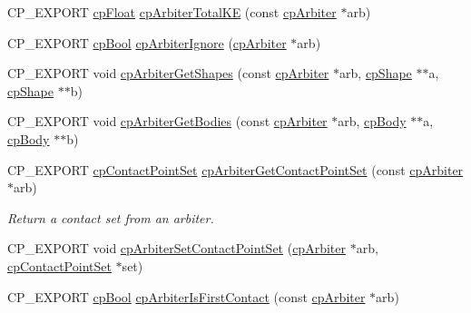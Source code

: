 \begin{DoxyCompactItemize}
\item 
C\+P\+\_\+\+E\+X\+P\+O\+RT \mbox{\hyperlink{group__basic_types_gac1ed65573e035bf892505768c852d8d3}{cp\+Float}} \mbox{\hyperlink{group__cp_arbiter_ga9918019bc0e4af5a2618e0ddeec4d64c}{cp\+Arbiter\+Total\+KE}} (const \mbox{\hyperlink{structcp_arbiter}{cp\+Arbiter}} $\ast$arb)
\item 
C\+P\+\_\+\+E\+X\+P\+O\+RT \mbox{\hyperlink{group__basic_types_gabc5e752c48f3449ca26ef413ecbd647e}{cp\+Bool}} \mbox{\hyperlink{group__cp_arbiter_ga7a643cd465bdb61b2f686fdf3558b263}{cp\+Arbiter\+Ignore}} (\mbox{\hyperlink{structcp_arbiter}{cp\+Arbiter}} $\ast$arb)
\item 
C\+P\+\_\+\+E\+X\+P\+O\+RT void \mbox{\hyperlink{group__cp_arbiter_ga521ac495c53bf25ab061a79643bb195a}{cp\+Arbiter\+Get\+Shapes}} (const \mbox{\hyperlink{structcp_arbiter}{cp\+Arbiter}} $\ast$arb, \mbox{\hyperlink{structcp_shape}{cp\+Shape}} $\ast$$\ast$a, \mbox{\hyperlink{structcp_shape}{cp\+Shape}} $\ast$$\ast$b)
\item 
C\+P\+\_\+\+E\+X\+P\+O\+RT void \mbox{\hyperlink{group__cp_arbiter_gac5371d101c55a8a9c5b471e12010a8b3}{cp\+Arbiter\+Get\+Bodies}} (const \mbox{\hyperlink{structcp_arbiter}{cp\+Arbiter}} $\ast$arb, \mbox{\hyperlink{structcp_body}{cp\+Body}} $\ast$$\ast$a, \mbox{\hyperlink{structcp_body}{cp\+Body}} $\ast$$\ast$b)
\item 
\mbox{\label{group__cp_arbiter_ga3bd7be89287b9955f650f3d9a01eae40}} 
C\+P\+\_\+\+E\+X\+P\+O\+RT \mbox{\hyperlink{structcp_contact_point_set}{cp\+Contact\+Point\+Set}} \mbox{\hyperlink{group__cp_arbiter_ga3bd7be89287b9955f650f3d9a01eae40}{cp\+Arbiter\+Get\+Contact\+Point\+Set}} (const \mbox{\hyperlink{structcp_arbiter}{cp\+Arbiter}} $\ast$arb)
\begin{DoxyCompactList}\small\item\em Return a contact set from an arbiter. \end{DoxyCompactList}\item 
C\+P\+\_\+\+E\+X\+P\+O\+RT void \mbox{\hyperlink{group__cp_arbiter_ga2a68f589f58dbae29de18cebee3de02d}{cp\+Arbiter\+Set\+Contact\+Point\+Set}} (\mbox{\hyperlink{structcp_arbiter}{cp\+Arbiter}} $\ast$arb, \mbox{\hyperlink{structcp_contact_point_set}{cp\+Contact\+Point\+Set}} $\ast$set)
\item 
\mbox{\label{group__cp_arbiter_gabd696398cfa9cfea7a9050119b4c9c4b}} 
C\+P\+\_\+\+E\+X\+P\+O\+RT \mbox{\hyperlink{group__basic_types_gabc5e752c48f3449ca26ef413ecbd647e}{cp\+Bool}} \mbox{\hyperlink{group__cp_arbiter_gabd696398cfa9cfea7a9050119b4c9c4b}{cp\+Arbiter\+Is\+First\+Contact}} (const \mbox{\hyperlink{structcp_arbiter}{cp\+Arbiter}} $\ast$arb)

\end{DoxyCompactItemize}
